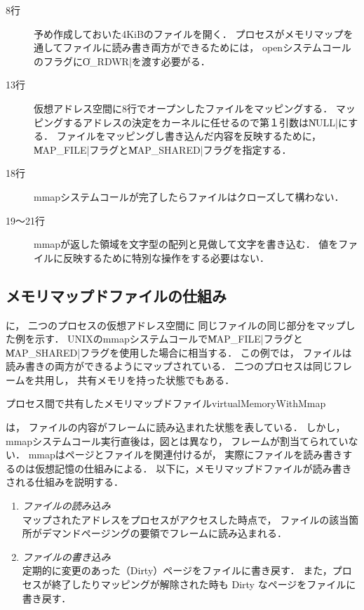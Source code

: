 \begin{description}
\item[8行] 予め作成しておいた4KiBのファイルを開く．
  プロセスがメモリマップを通してファイルに読み書き両方ができるためには，
  openシステムコールのフラグに\|O_RDWR|を渡す必要がる．
\item[13行] 仮想アドレス空間に8行でオープンしたファイルをマッピングする．
  マッピングするアドレスの決定をカーネルに任せるので第１引数は\|NULL|にする．
  ファイルをマッピングし書き込んだ内容を反映するために，
  \|MAP_FILE|フラグと\|MAP_SHARED|フラグを指定する．
\item[18行] mmapシステムコールが完了したらファイルはクローズして構わない．
\item[19〜21行] mmapが返した領域を文字型の配列と見做して文字を書き込む． 
  値をファイルに反映するために特別な操作をする必要はない．
\end{description}

\subsection{メモリマップドファイルの仕組み}
に，
二つのプロセスの仮想アドレス空間に
同じファイルの同じ部分をマップした例を示す．
UNIXのmmapシステムコールで\|MAP_FILE|フラグと
\|MAP_SHARED|フラグを使用した場合に相当する．
この例では，
ファイルは読み書きの両方ができるようにマップされている．
二つのプロセスは同じフレームを共用し，
共有メモリを持った状態でもある．

         {プロセス間で共有したメモリマップドファイル}{virtualMemoryWithMmap}

は，
ファイルの内容がフレームに読み込まれた状態を表している．
しかし，mmapシステムコール実行直後は，図とは異なり，
フレームが割当てられていない．
mmapはページとファイルを関連付けるが，
実際にファイルを読み書きするのは仮想記憶の仕組みによる．
以下に，メモリマップドファイルが読み書きされる仕組みを説明する．

\begin{enumerate}
\item \emph{ファイルの読み込み} \\
  マップされたアドレスをプロセスがアクセスした時点で，
  ファイルの該当箇所がデマンドページングの要領でフレームに読み込まれる．
\item \emph{ファイルの書き込み} \\
  定期的に変更のあった（Dirty）ページをファイルに書き戻す．
  また，プロセスが終了したりマッピングが解除された時も
  Dirty なページをファイルに書き戻す．
\end{enumerate}

